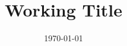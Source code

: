 \documentclass[12pt]{article}
\begin{document}
 
\title{Working Title} 


\date{\today} 
\maketitle







\end{document}
